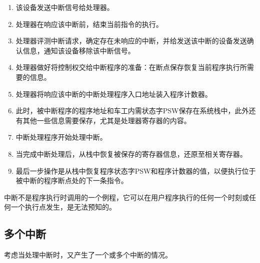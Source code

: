 {{        \begin{enumerate}
            \item 该设备发送中断信号给处理器。
            \item 处理器在响应该中断前，结束当前指令的执行。
            \item 处理器评测中断请求，确定存在未响应的中断，并给发送该中断的设备发送确认信息，通知该设备移除该中断信号。
            \item 处理器做好将控制权交给中断程序的准备：在断点保存恢复当前程序执行所需要的信息。
            \item 处理器将响应该中断的中断处理程序入口地址装入程序计数器。
            \item 此时，被中断程序的程序地址和车工内需状态字PSW保存在系统栈中，此外还有其他一些信息需要保存，尤其是处理器寄存器的内容。
            \item 中断处理程序开始处理中断。
            \item 当完成中断处理后，从栈中恢复被保存的寄存器信息，还原至相关寄存器。
            \item 最后一步操作是从栈中恢复程序状态字PSW和程序计数器的值，以便执行位于被中断的程序断点处的下一条指令。
        \end{enumerate}

        中断不是程序执行时调用的一个例程，它可以在用户程序执行的任何一个时刻或任何一个执行点发生，是无法预知的。
    }

    \subsection{多个中断}
    {
        考虑当处理中断时，又产生了一个或多个中断的情况。
    }
}
